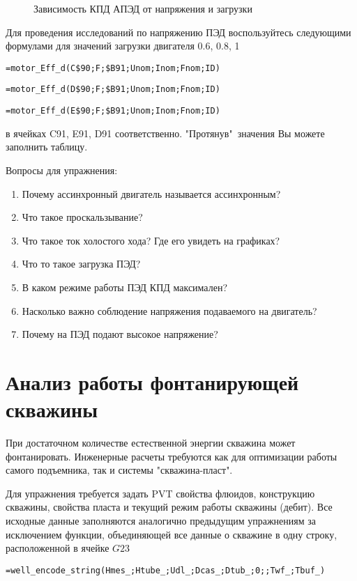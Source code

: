 \begin{figure}[h!]
	\center{\texttt{[image: Ex80\_3]}}
	\caption{Зависимость КПД АПЭД от напряжения и загрузки}
	\label{ris:Ex80_3}
\end{figure}

Для проведения исследований по напряжению ПЭД воспользуйтесь следующими формулами для значений загрузки двигателя 0.6, 0.8, 1 

{ \small  \texttt{=motor\_Eff\_d(C\$90;F;\$B91;Unom;Inom;Fnom;ID)}}

{ \small  \texttt{=motor\_Eff\_d(D\$90;F;\$B91;Unom;Inom;Fnom;ID)}}

{ \small  \texttt{=motor\_Eff\_d(E\$90;F;\$B91;Unom;Inom;Fnom;ID)}}

в ячейках C91, E91, D91 соответственно. "Протянув"\ значения Вы можете заполнить таблицу.

Вопросы для упражнения:

\begin{enumerate}
	\item Почему ассинхронный двигатель называется ассинхронным?
	\item Что такое проскальзывание?
	\item Что такое ток холостого хода? Где его увидеть на графиках?
	\item Что то такое загрузка ПЭД?
	\item В каком режиме работы ПЭД КПД максимален?
	\item Насколько важно соблюдение напряжения подаваемого на двигатель?
	\item Почему на ПЭД подают высокое напряжение?
\end{enumerate}


\section{Анализ работы фонтанирующей скважины}

При достаточном количестве естественной энергии скважина может фонтанировать. Инженерные расчеты требуются как для оптимизации работы самого подъемника, так и системы "скважина-пласт".

Для упражнения требуется задать PVT свойства флюидов, конструкцию скважины, свойства пласта и текущий режим работы скважины (дебит). Все исходные данные заполняются аналогично предыдущим упражнениям за исключением функции, объединяющей все данные о скважине в одну строку, расположенной в ячейке  $G23$

{ \small  \texttt{=well\_encode\_string(Hmes\_;Htube\_;Udl\_;Dcas\_;Dtub\_;0;;Twf\_;Tbuf\_)
}}

